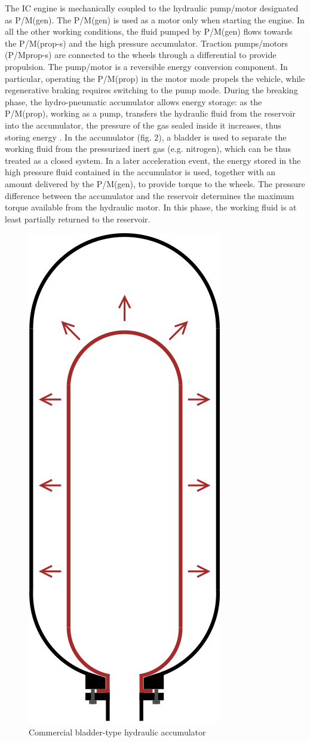 \documentclass[11pt]{article}
\begin{document}
The IC engine is mechanically coupled to the hydraulic pump/motor designated as P/M(gen). The P/M(gen) is used as a motor only when starting the engine. In all the other working conditions, the fluid pumped by P/M(gen) flows towards the P/M(prop-s) and the high pressure accumulator. Traction pumps/motors (P/Mprop-s) are connected to the wheels through a differential to provide propulsion. The pump/motor is a reversible energy conversion component. In particular, operating the P/M(prop) in the motor mode propels the vehicle, while regenerative braking requires switching to the pump mode. During the breaking phase, the hydro-pneumatic accumulator allows energy storage: as the P/M(prop), working as a pump, transfers the hydraulic fluid from the reservoir into the accumulator, the pressure of the gas sealed inside it increases, thus storing energy \cite{e}. In the accumulator (fig. 2), a bladder is used to separate the working fluid from the pressurized inert gas (e.g. nitrogen), which can be thus treated as a closed system. In a later acceleration event, the energy stored in the high pressure fluid contained in the accumulator is used, together with an amount delivered by the P/M(gen), to provide torque to the wheels. The pressure difference between the accumulator and the reservoir determines the maximum torque available from the hydraulic motor. In this phase, the working fluid is at least partially returned to the reservoir. 

\begin{figure}[H]
\centering
\includegraphics[width=.4\textwidth]{Images/Hydraulic Accumulator}
\caption{Commercial bladder-type hydraulic accumulator}
\label{hydraulic_accumulator}
\end{figure}
\end{document}
